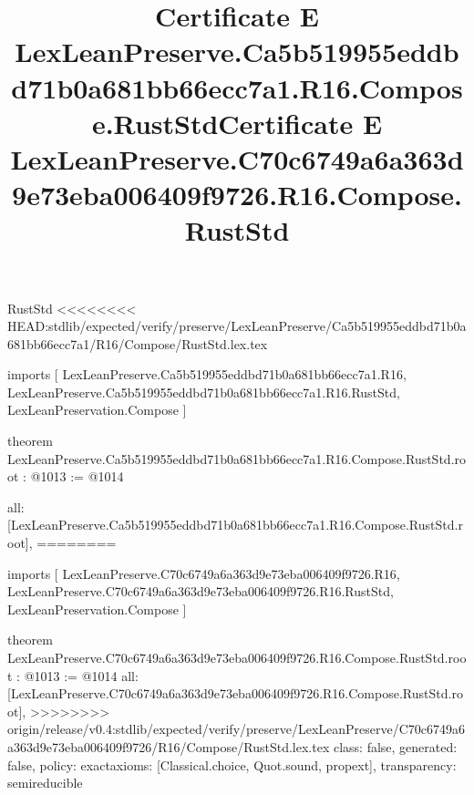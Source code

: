 \begin{lexlean}{RustStd}
<<<<<<<< HEAD:stdlib/expected/verify/preserve/LexLeanPreserve/Ca5b519955eddbd71b0a681bb66ecc7a1/R16/Compose/RustStd.lex.tex
\title{Certificate E LexLeanPreserve.Ca5b519955eddbd71b0a681bb66ecc7a1.R16.Compose.RustStd}
\begin{coremodule}
imports [
  LexLeanPreserve.Ca5b519955eddbd71b0a681bb66ecc7a1.R16,
  LexLeanPreserve.Ca5b519955eddbd71b0a681bb66ecc7a1.R16.RustStd,
  LexLeanPreservation.Compose
]

theorem LexLeanPreserve.Ca5b519955eddbd71b0a681bb66ecc7a1.R16.Compose.RustStd.root : @1013 := @1014 {
  all: [LexLeanPreserve.Ca5b519955eddbd71b0a681bb66ecc7a1.R16.Compose.RustStd.root],
========
\title{Certificate E LexLeanPreserve.C70c6749a6a363d9e73eba006409f9726.R16.Compose.RustStd}
\begin{coremodule}
imports [
  LexLeanPreserve.C70c6749a6a363d9e73eba006409f9726.R16,
  LexLeanPreserve.C70c6749a6a363d9e73eba006409f9726.R16.RustStd,
  LexLeanPreservation.Compose
]

theorem LexLeanPreserve.C70c6749a6a363d9e73eba006409f9726.R16.Compose.RustStd.root : @1013 := @1014 {
  all: [LexLeanPreserve.C70c6749a6a363d9e73eba006409f9726.R16.Compose.RustStd.root],
>>>>>>>> origin/release/v0.4:stdlib/expected/verify/preserve/LexLeanPreserve/C70c6749a6a363d9e73eba006409f9726/R16/Compose/RustStd.lex.tex
  class: false,
  generated: false,
  policy: exact{axioms: [Classical.choice, Quot.sound, propext]},
  transparency: semireducible
}


\end{coremodule}}
\end{coremodule}
\end{lexlean}
